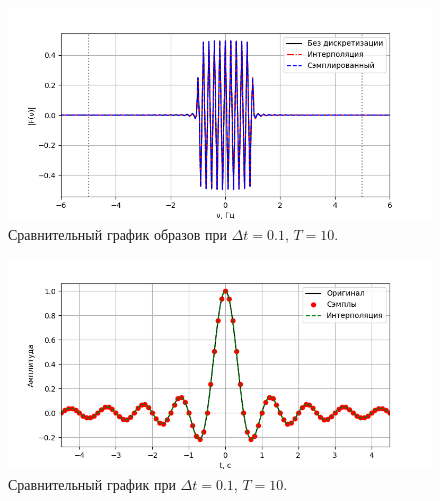 \documentclass[a4paper]{article}
\begin{document}
\begin{figure}[H]
  \centering
  \includegraphics[width=\textwidth]{src/task_2/2_freq_10_0.1.png}
  \caption{Сравнительный график образов при $\Delta t=0.1$, $T=10$.} 
\end{figure}
\begin{figure}[H]
  \centering
  \includegraphics[width=\textwidth]{src/task_2/2_time_10_0.1.png}
  \caption{Сравнительный график при $\Delta t=0.1$, $T=10$.} 
\end{figure}
\end{document}
